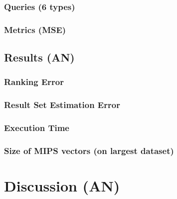 \documentclass{sig-alternate}  %
\begin{document}
\subsubsection{Queries (6 types)}
\subsubsection{Metrics (MSE)}
\subsection{Results (AN)}
\subsubsection{Ranking Error}
\subsubsection{Result Set Estimation Error}
\subsubsection{Execution Time}
\subsubsection{Size of MIPS vectors (on largest dataset)}
\section{Discussion (AN)}
\end{document}
